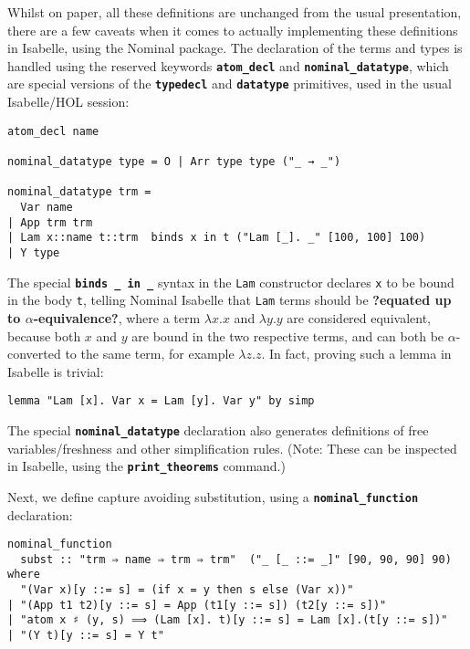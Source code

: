 \documentclass[a4paper, 12pt, twoside]{style/ociamthesis}
\theoremstyle{plain}
\theoremstyle{definition}
\theoremstyle{remark}
\begin{document}
Whilst on paper, all these definitions are unchanged from the usual
presentation, there are a few caveats when it comes to actually
implementing these definitions in Isabelle, using the Nominal package.
The declaration of the terms and types is handled using the reserved
keywords \textbf{\texttt{atom\_decl}} and
\textbf{\texttt{nominal\_datatype}}, which are special versions of the
\textbf{\texttt{typedecl}} and \textbf{\texttt{datatype}} primitives,
used in the usual Isabelle/HOL session:

\begin{verbatim}
atom_decl name

nominal_datatype type = O | Arr type type ("_ → _")

nominal_datatype trm =
  Var name
| App trm trm
| Lam x::name t::trm  binds x in t ("Lam [_]. _" [100, 100] 100)
| Y type
\end{verbatim}

The special \textbf{\texttt{binds \_ in \_}} syntax in the \texttt{Lam}
constructor declares \texttt{x} to be bound in the body \texttt{t},
telling Nominal Isabelle that \texttt{Lam} terms should be
\textbf{?equated up to \(\alpha\)-equivalence?}, where a term
\(\lambda x. x\) and \(\lambda y. y\) are considered equivalent, because
both \(x\) and \(y\) are bound in the two respective terms, and can both
be \(\alpha\)-converted to the same term, for example \(\lambda z .z\).
In fact, proving such a lemma in Isabelle is trivial:

\begin{verbatim}
lemma "Lam [x]. Var x = Lam [y]. Var y" by simp
\end{verbatim}

The special \textbf{\texttt{nominal\_datatype}} declaration also
generates definitions of free variables/freshness and other
simplification rules. (Note: These can be inspected in Isabelle, using
the \textbf{\texttt{print\_theorems}} command.)

Next, we define capture avoiding substitution, using a
\textbf{\texttt{nominal\_function}} declaration:

\begin{verbatim}
nominal_function
  subst :: "trm ⇒ name ⇒ trm ⇒ trm"  ("_ [_ ::= _]" [90, 90, 90] 90)
where
  "(Var x)[y ::= s] = (if x = y then s else (Var x))"
| "(App t1 t2)[y ::= s] = App (t1[y ::= s]) (t2[y ::= s])"
| "atom x ♯ (y, s) ⟹ (Lam [x]. t)[y ::= s] = Lam [x].(t[y ::= s])"
| "(Y t)[y ::= s] = Y t"
\end{verbatim}
\end{document}
